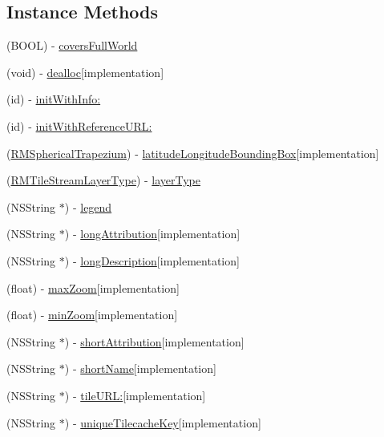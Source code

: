 \subsection*{Instance Methods}
\begin{DoxyCompactItemize}
\item 
(B\-O\-O\-L) -\/ \hyperlink{interface_r_m_tile_stream_source_a4128501d7122d3f849ccc33ba735d28c}{covers\-Full\-World}
\item 
(void) -\/ \hyperlink{interface_r_m_tile_stream_source_a211ce6db8a319dab3d1089954b5d0f3a}{dealloc}{\ttfamily  \mbox{[}implementation\mbox{]}}
\item 
(id) -\/ \hyperlink{interface_r_m_tile_stream_source_a3bb9f28c43e44033393e2ce86a2b2546}{init\-With\-Info\-:}
\item 
(id) -\/ \hyperlink{interface_r_m_tile_stream_source_ae8b1b0f6c820adf5680fa799b918ad6a}{init\-With\-Reference\-U\-R\-L\-:}
\item 
(\hyperlink{struct_r_m_spherical_trapezium}{R\-M\-Spherical\-Trapezium}) -\/ \hyperlink{interface_r_m_tile_stream_source_a483efb3bdcc1dad1a464506b94e39d78}{latitude\-Longitude\-Bounding\-Box}{\ttfamily  \mbox{[}implementation\mbox{]}}
\item 
(\hyperlink{_r_m_tile_stream_source_8h_ab3d605b7c268a35d197400e0963ae3a4}{R\-M\-Tile\-Stream\-Layer\-Type}) -\/ \hyperlink{interface_r_m_tile_stream_source_a55be836cda5d0582aa152d278885eac2}{layer\-Type}
\item 
(N\-S\-String $\ast$) -\/ \hyperlink{interface_r_m_tile_stream_source_a1e63208e7270ba2d75b01c67c32c4e91}{legend}
\item 
(N\-S\-String $\ast$) -\/ \hyperlink{interface_r_m_tile_stream_source_aa977502a8d80f3abcea6669c0cbb2fe7}{long\-Attribution}{\ttfamily  \mbox{[}implementation\mbox{]}}
\item 
(N\-S\-String $\ast$) -\/ \hyperlink{interface_r_m_tile_stream_source_a791cffd82b75f0c9853f2ed49aa635f4}{long\-Description}{\ttfamily  \mbox{[}implementation\mbox{]}}
\item 
(float) -\/ \hyperlink{interface_r_m_tile_stream_source_ad126cd46e17ef5ad95a6cf0533e17fe0}{max\-Zoom}{\ttfamily  \mbox{[}implementation\mbox{]}}
\item 
(float) -\/ \hyperlink{interface_r_m_tile_stream_source_a8a0c7a44fb2d194d2685c1f26187e6e5}{min\-Zoom}{\ttfamily  \mbox{[}implementation\mbox{]}}
\item 
(N\-S\-String $\ast$) -\/ \hyperlink{interface_r_m_tile_stream_source_af29e760b684cfb520dbbd8f5f0f41686}{short\-Attribution}{\ttfamily  \mbox{[}implementation\mbox{]}}
\item 
(N\-S\-String $\ast$) -\/ \hyperlink{interface_r_m_tile_stream_source_a059871decc3a5ad1a72d70b691b343b7}{short\-Name}{\ttfamily  \mbox{[}implementation\mbox{]}}
\item 
(N\-S\-String $\ast$) -\/ \hyperlink{interface_r_m_tile_stream_source_ae4c4f099f3f2d43081accc1de9d2c5a8}{tile\-U\-R\-L\-:}{\ttfamily  \mbox{[}implementation\mbox{]}}
\item 
(N\-S\-String $\ast$) -\/ \hyperlink{interface_r_m_tile_stream_source_ab121a1455447ad90239e7f4ca78ce9a3}{unique\-Tilecache\-Key}{\ttfamily  \mbox{[}implementation\mbox{]}}
\end{DoxyCompactItemize}
